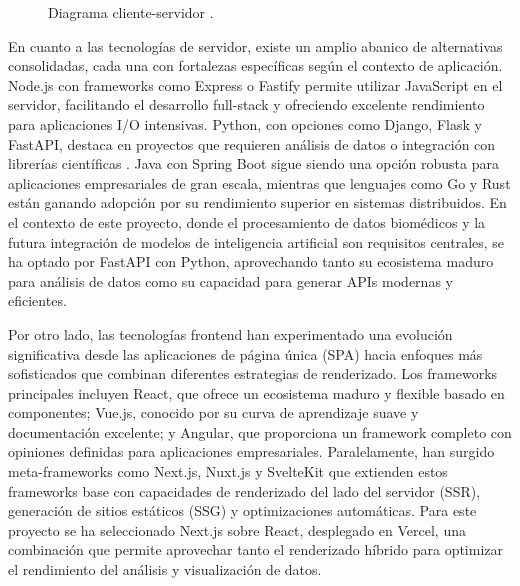 \begin{figure}[H]
    \centering
    \caption{Diagrama cliente-servidor \cite{clienteservidorfoto}.}
\end{figure}



En cuanto a las tecnologías de servidor, existe un amplio abanico de alternativas consolidadas, cada una con fortalezas específicas según el contexto de aplicación. Node.js con frameworks como Express o Fastify permite utilizar JavaScript en el servidor, facilitando el desarrollo full-stack y ofreciendo excelente rendimiento para aplicaciones I/O intensivas. Python, con opciones como Django, Flask y FastAPI, destaca en proyectos que requieren análisis de datos o integración con librerías científicas \cite{Castro2023_PythonDataScience}. Java con Spring Boot sigue siendo una opción robusta para aplicaciones empresariales de gran escala, mientras que lenguajes como Go y Rust están ganando adopción por su rendimiento superior en sistemas distribuidos. En el contexto de este proyecto, donde el procesamiento de datos biomédicos y la futura integración de modelos de inteligencia artificial son requisitos centrales, se ha optado por FastAPI con Python, aprovechando tanto su ecosistema maduro para análisis de datos como su capacidad para generar APIs modernas y eficientes.

Por otro lado, las tecnologías frontend han experimentado una evolución significativa desde las aplicaciones de página única (SPA) hacia enfoques más sofisticados que combinan diferentes estrategias de renderizado. Los frameworks principales \cite{Swacha2023_WebFrameworks} incluyen React, que ofrece un ecosistema maduro y flexible basado en componentes; Vue.js, conocido por su curva de aprendizaje suave y documentación excelente; y Angular, que proporciona un framework completo con opiniones definidas para aplicaciones empresariales. Paralelamente, han surgido meta-frameworks como Next.js, Nuxt.js y SvelteKit que extienden estos frameworks base con capacidades de renderizado del lado del servidor (SSR), generación de sitios estáticos (SSG) y optimizaciones automáticas. Para este proyecto se ha seleccionado Next.js sobre React, desplegado en Vercel, una combinación que permite aprovechar tanto el renderizado híbrido para optimizar el rendimiento del análisis y visualización de datos.

